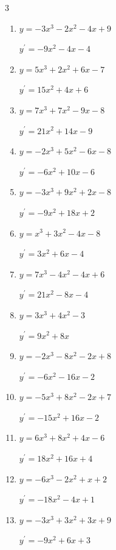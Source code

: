 \begin{multicols}{3}
\begin{enumerate}
  \item $y=-3x^{3}-2x^{2}-4x+9$

        $\displaystyle y^{\prime}=-9x^{2}-4x-4$

  \item $y=5x^{3}+2x^{2}+6x-7$

        $\displaystyle y^{\prime}=15x^{2}+4x+6$

  \item $y=7x^{3}+7x^{2}-9x-8$

        $\displaystyle y^{\prime}=21x^{2}+14x-9$

  \item $y=-2x^{3}+5x^{2}-6x-8$

        $\displaystyle y^{\prime}=-6x^{2}+10x-6$

  \item $y=-3x^{3}+9x^{2}+2x-8$

        $\displaystyle y^{\prime}=-9x^{2}+18x+2$

  \item $y=x^{3}+3x^{2}-4x-8$

        $\displaystyle y^{\prime}=3x^{2}+6x-4$

  \item $y=7x^{3}-4x^{2}-4x+6$

        $\displaystyle y^{\prime}=21x^{2}-8x-4$

  \item $y=3x^{3}+4x^{2}-3$

        $\displaystyle y^{\prime}=9x^{2}+8x$

  \item $y=-2x^{3}-8x^{2}-2x+8$

        $\displaystyle y^{\prime}=-6x^{2}-16x-2$

  \item $y=-5x^{3}+8x^{2}-2x+7$

        $\displaystyle y^{\prime}=-15x^{2}+16x-2$

  \item $y=6x^{3}+8x^{2}+4x-6$

        $\displaystyle y^{\prime}=18x^{2}+16x+4$

\columnbreak %

  \item $y=-6x^{3}-2x^{2}+x+2$

        $\displaystyle y^{\prime}=-18x^{2}-4x+1$

  \item $y=-3x^{3}+3x^{2}+3x+9$

        $\displaystyle y^{\prime}=-9x^{2}+6x+3$


\end{enumerate}
\end{multicols}
